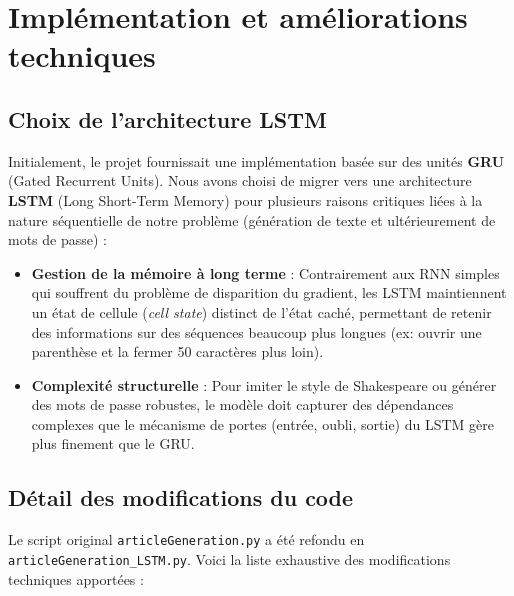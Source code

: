 \documentclass[a4paper]{article}
\begin{document}
\section{Implémentation et améliorations techniques}

\subsection{Choix de l'architecture LSTM}
Initialement, le projet fournissait une implémentation basée sur des unités \textbf{GRU} (Gated Recurrent Units). Nous avons choisi de migrer vers une architecture \textbf{LSTM} (Long Short-Term Memory) pour plusieurs raisons critiques liées à la nature séquentielle de notre problème (génération de texte et ultérieurement de mots de passe) :

\begin{itemize}
    \item \textbf{Gestion de la mémoire à long terme} : Contrairement aux RNN simples qui souffrent du problème de disparition du gradient, les LSTM maintiennent un état de cellule (\textit{cell state}) distinct de l'état caché, permettant de retenir des informations sur des séquences beaucoup plus longues (ex: ouvrir une parenthèse et la fermer 50 caractères plus loin).
    \item \textbf{Complexité structurelle} : Pour imiter le style de Shakespeare ou générer des mots de passe robustes, le modèle doit capturer des dépendances complexes que le mécanisme de portes (entrée, oubli, sortie) du LSTM gère plus finement que le GRU.
\end{itemize}

\subsection{Détail des modifications du code}
Le script original \lstinline|articleGeneration.py| a été refondu en \lstinline|articleGeneration_LSTM.py|. Voici la liste exhaustive des modifications techniques apportées :
\end{document}
